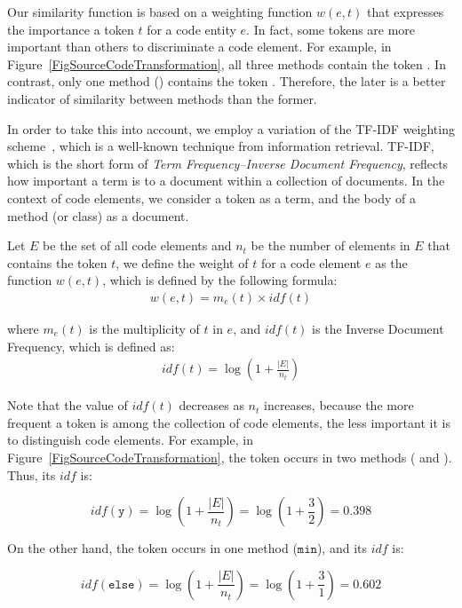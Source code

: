 
Our similarity function is based on a weighting function $w(e, t)$ that expresses the importance a token $t$ for a code entity $e$.
In fact, some tokens are more important than others to discriminate a code element.
For example, in Figure~\ref{FigSourceCodeTransformation}, all three methods contain the token . In contrast, only one method () contains the token . Therefore, the later is a better indicator of similarity between methods than the former.

In order to take this into account, we employ a variation of the TF-IDF weighting scheme~\cite{salton1986introduction}, which is a well-known technique from information retrieval.
TF-IDF, which is the short form of \emph{Term Frequency–Inverse Document Frequency}, reflects how important a term is to a document within a collection of documents.
In the context of code elements, we consider a token as a term, and the body of a method (or class) as a document.

Let $E$ be the set of all code elements and $n_t$ be the number of elements in $E$ that contains the token $t$,
we define the weight of $t$ for a code element $e$ as the function $w(e, t)$, which is defined by the following formula:
\begin{align}
w(e, t) = m_e(t) \times \mathit{idf}(t)
\end{align}

\noindent where $m_e(t)$ is the multiplicity of $t$ in $e$, and $\mathit{idf}(t)$ is the Inverse Document Frequency, which is defined as:
\begin{align}
\mathit{idf}(t) = \log (1 + \frac{|E|}{n_t})
\end{align}

Note that the value of $\mathit{idf}(t)$ decreases as $n_t$ increases, because the more frequent a token is among the collection of code elements, the less important it is to distinguish code elements.
For example, in Figure~\ref{FigSourceCodeTransformation}, the token  occurs in two methods ( and ). Thus, its $\mathit{idf}$ is:

\[
\mathit{idf}(\mathtt{y}) = 
\log (1 + \frac{|E|}{n_t}) = 
\log (1 + \frac{3}{2}) = 0.398
\]

On the other hand, the token  occurs in one method ($\mathtt{min}$), and its $\mathit{idf}$ is:

\[
\mathit{idf}(\mathtt{else}) = 
\log (1 + \frac{|E|}{n_t}) = 
\log (1 + \frac{3}{1}) = 0.602
\]


